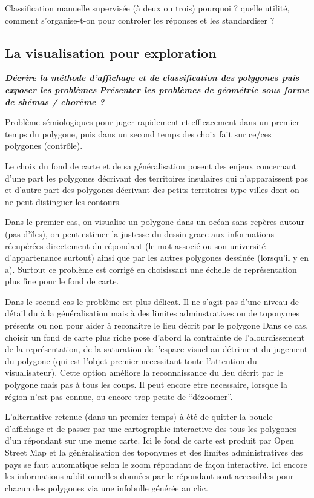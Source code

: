 \documentclass[
  12pt,
  a4paperpaper,
]{book}
\begin{document}
Classification manuelle supervisée (à deux ou trois) pourquoi ? quelle
utilité, comment s'organise-t-on pour controler les réponses et les
standardiser ?

\hypertarget{la-visualisation-pour-exploration}{%
\subsection{La visualisation pour
exploration}\label{la-visualisation-pour-exploration}}

\textbf{\emph{Décrire la méthode d'affichage et de classification des
polygones puis exposer les problèmes}} \textbf{\emph{Présenter les
problèmes de géométrie sous forme de shémas / chorème ?}}

Problème sémiologiques pour juger rapidement et efficacement dans un
premier temps du polygone, puis dans un second temps des choix fait sur
ce/ces polygones (contrôle).

Le choix du fond de carte et de sa généralisation posent des enjeux
concernant d'une part les polygones décrivant des territoires insulaires
qui n'apparaissent pas et d'autre part des polygones décrivant des
petits territoires type villes dont on ne peut distinguer les contours.

Dans le premier cas, on visualise un polygone dans un océan sans repères
autour (pas d'îles), on peut estimer la justesse du dessin grace aux
informations récupérées directement du répondant (le mot associé ou son
université d'appartenance surtout) ainsi que par les autres polygones
dessinée (lorsqu'il y en a). Surtout ce problème est corrigé en
choisissant une échelle de représentation plus fine pour le fond de
carte.

Dans le second cas le problème est plus délicat. Il ne s'agit pas d'une
niveau de détail du à la généralisation mais à des limites
adminstratives ou de toponymes présents ou non pour aider à reconaitre
le lieu décrit par le polygone Dans ce cas, choisir un fond de carte
plus riche pose d'abord la contrainte de l'alourdissement de la
représentation, de la saturation de l'espace visuel au détriment du
jugement du polygone (qui est l'objet premier necessitant toute
l'attention du visualisateur). Cette option améliore la reconnaissance
du lieu décrit par le polygone mais pas à tous les coups. Il peut encore
etre necessaire, lorsque la région n'est pas connue, ou encore trop
petite de ``dézoomer''.

L'alternative retenue (dans un premier temps) à été de quitter la boucle
d'affichage et de passer par une cartographie interactive des tous les
polygones d'un répondant sur une meme carte. Ici le fond de carte est
produit par Open Street Map et la généralisation des toponymes et des
limites administratives des pays se faut automatique selon le zoom
répondant de façon interactive. Ici encore les informations
additionnelles données par le répondant sont accessibles pour chacun des
polygones via une infobulle générée au clic.
\end{document}
